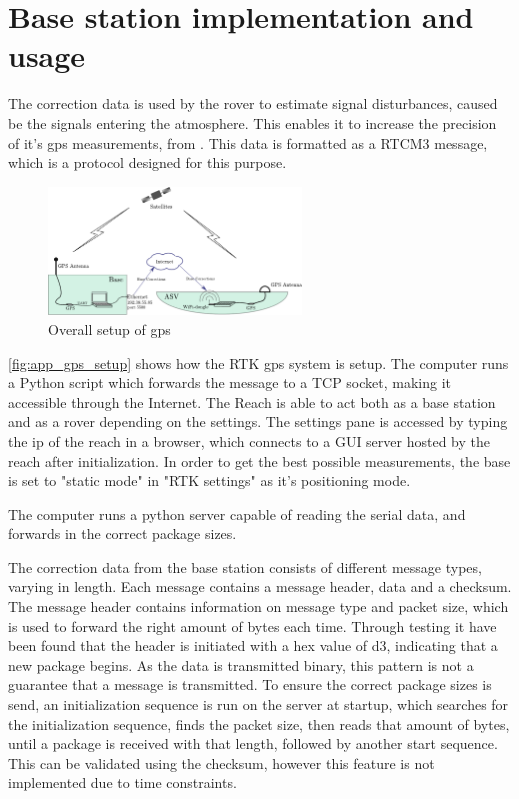 \section{Base station implementation and usage}
The correction data is used by the rover to estimate signal disturbances, caused be the signals entering the atmosphere. 
This enables it to increase the precision of it's gps measurements, from .
This data is formatted as a RTCM3 message, which is a protocol designed for this purpose.
\begin{figure}[H]
	\includegraphics[width=0.6\textwidth]{figures/comunicationSetup.pdf}
	\caption{Overall setup of gps}
	\label{fig:app_gps_setup}
\end{figure}
\autoref{fig:app_gps_setup} shows how the RTK gps system is setup. 
The computer runs a Python script which forwards the message to a TCP socket, making it accessible through the Internet. 
The Reach is able to act both as a base station and as a rover depending on the settings.
The settings pane is accessed by typing the ip of the reach in a browser, which connects to a GUI server hosted by the reach after initialization.
In order to get the best possible measurements, the base is set to "static mode" in "RTK settings" as it's positioning mode.



The computer runs a python server capable of reading the serial data, and forwards in the correct package sizes.

The correction data from the base station consists of different message types, varying in length.
Each message contains a message header, data and a checksum. 
The message header contains information on message type and packet size, which is used to forward the right amount of bytes each time.
Through testing it have been found that the header is initiated with a hex value of d3, indicating that a new package begins. 
As the data is transmitted binary, this pattern is not a guarantee that a message is transmitted. 
To ensure the correct package sizes is send, an initialization sequence is run on the server at startup, which searches for the initialization sequence, finds the packet size, then reads that amount of bytes, until a package is received with that length, followed by another start sequence.
This can be validated using the checksum, however this feature is not implemented due to time constraints. 

